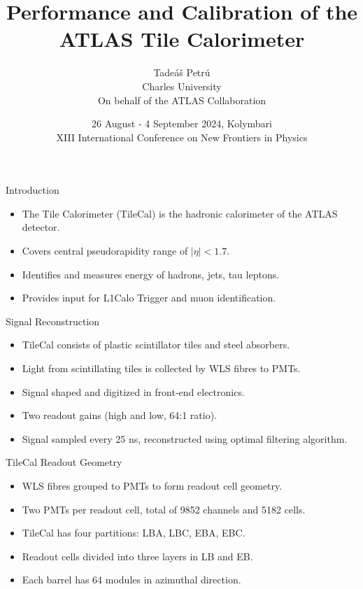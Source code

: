 \documentclass[presentation]{beamer}
\title{Performance and Calibration of the ATLAS Tile Calorimeter}
\author{Tade\'a\v{s} Petr\'u\\ Charles University\\ On behalf of the ATLAS Collaboration}
\date{26 August - 4 September 2024, Kolymbari\\ XIII International Conference on New Frontiers in Physics}
\begin{document}
\begin{frame}
    \titlepage
\end{frame}

\begin{frame}{Introduction}
    \begin{itemize}
        \item The Tile Calorimeter (TileCal) is the hadronic calorimeter of the ATLAS detector.
        \item Covers central pseudorapidity range of $|\eta| < 1.7$.
        \item Identifies and measures energy of hadrons, jets, tau leptons.
        \item Provides input for L1Calo Trigger and muon identification.
    \end{itemize}
\end{frame}

\begin{frame}{Signal Reconstruction}
    \begin{itemize}
        \item TileCal consists of plastic scintillator tiles and steel absorbers.
        \item Light from scintillating tiles is collected by WLS fibres to PMTs.
        \item Signal shaped and digitized in front-end electronics.
        \item Two readout gains (high and low, 64:1 ratio).
        \item Signal sampled every 25 ns, reconstructed using optimal filtering algorithm.
    \end{itemize}
\end{frame}

\begin{frame}{TileCal Readout Geometry}
    \begin{itemize}
        \item WLS fibres grouped to PMTs to form readout cell geometry.
        \item Two PMTs per readout cell, total of 9852 channels and 5182 cells.
        \item TileCal has four partitions: LBA, LBC, EBA, EBC.
        \item Readout cells divided into three layers in LB and EB.
        \item Each barrel has 64 modules in azimuthal direction.
    \end{itemize}
\end{frame}
\end{document}
